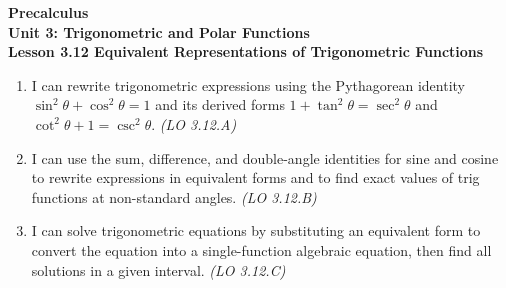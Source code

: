 \documentclass[10pt]{article}
\begin{document}
\vspace{-0.8in}

\begin{center}
  {\color{white}\textbf{\LARGE Precalculus}}\\[4pt]
  {\color{skymid}\large\textbf{Unit 3: Trigonometric and Polar Functions}}\\[6pt]
  {\color{white}\textbf{\large Lesson 3.12 \quad Equivalent Representations of Trigonometric Functions}}
\end{center}

\vspace{0.22in}
\namedateperiod
\vspace{0.18in}

\begin{learningtargetbox}
\small
\begin{enumerate}[leftmargin=1.5em, itemsep=5pt]
  \item I can rewrite trigonometric expressions using the Pythagorean identity
    $\sin^2\theta + \cos^2\theta = 1$ and its derived forms
    $1 + \tan^2\theta = \sec^2\theta$ and $\cot^2\theta + 1 = \csc^2\theta$.
    \hfill\textit{(LO 3.12.A)}
  \item I can use the sum, difference, and double-angle identities for sine and cosine
    to rewrite expressions in equivalent forms and to find exact values of trig functions
    at non-standard angles. \hfill\textit{(LO 3.12.B)}
  \item I can solve trigonometric equations by substituting an equivalent form to convert
    the equation into a single-function algebraic equation, then find all solutions in a
    given interval. \hfill\textit{(LO 3.12.C)}
\end{enumerate}
\end{learningtargetbox}

\vspace{0.14in}
\end{document}
